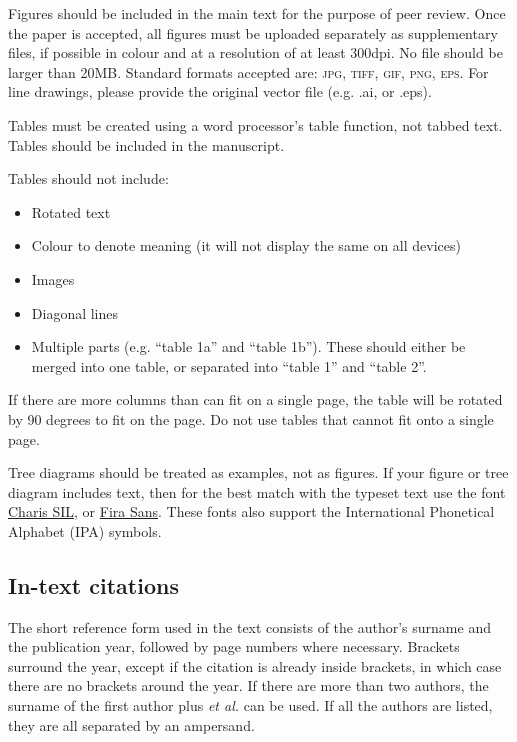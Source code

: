 \documentclass[charis,linguex]{glossa}
\begin{document}
Figures should be included in the main text for the purpose of peer review. Once the paper is accepted, all figures must be uploaded separately as supplementary files, if possible in colour and at a resolution of at least 300dpi. No file should be larger than 20MB. Standard formats accepted are: \textsc{jpg, tiff, gif, png, eps}. For line drawings, please provide the original vector file (e.g. .ai, or .eps).

Tables must be created using a word processor's table function, not tabbed text. Tables should be included in the manuscript. 

Tables should not include:

\begin{itemize}
\item Rotated text
\item Colour to denote meaning (it will not display the same on all devices)
\item Images
\item Diagonal lines
\item Multiple parts (e.g. ``table 1a'' and ``table 1b''). These should either be merged into one table, or separated into ``table 1'' and ``table 2''.
\end{itemize}
If there are more columns than can fit on a single page, the table will be rotated by 90 degrees to fit on the page. Do not use tables that cannot fit onto a single page.

Tree diagrams should be treated as examples, not as figures. If your figure or tree diagram includes text, then for the best match with the typeset text use the font \href{https://software.sil.org/charis/download/}{Charis SIL}, or \href{https://www.fontsquirrel.com/fonts/fira-sans}{Fira Sans}. These fonts also support the International Phonetical Alphabet (IPA) symbols.


\subsection{In-text citations}

The short reference form used in the text consists of the author’s surname and the publication year, followed by page numbers where necessary. Brackets surround the year, except if the citation is already inside brackets, in which case there are no brackets around the year. If there are more than two authors, the surname of the first author plus \textit{et al.} can be used. If all the authors are listed, they are all separated by an ampersand.
\end{document}
